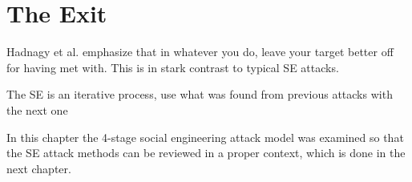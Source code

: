 \section{The Exit}
\begin{comment}
    
    - Not burning any bridges
    - Using the built relationships for future SE attacks
    - "Always leave them better off for having met you" also serves the purpose of using built relationships in the future again

\end{comment}


Hadnagy et al. emphasize that in whatever you do, leave your target better off for having met with. This is in stark contrast to typical SE attacks.

The SE is an iterative process, use what was found from previous attacks with the next one

In this chapter the 4-stage social engineering attack model was examined so that the SE attack methods can be reviewed in a proper context, which is done in the next chapter.